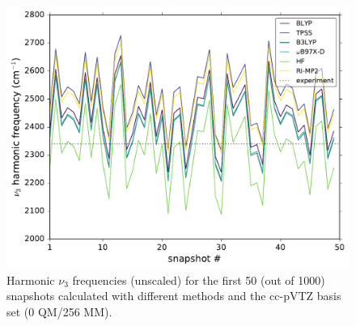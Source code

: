 \begin{figure}
  \centering
  \includegraphics[width=\textwidth]{./paper_02/trajectory_frequencies_cc-pvtz.pdf}
  \caption[Instantaneous method and basis set dependence of MD snapshots]{Harmonic \(\nu_{3}\) frequencies (unscaled) for the first \num{50} (out of \num{1000}) snapshots calculated with different methods and the cc-pVTZ basis set (0 QM/256 MM).}
  \label{paper_02:fig:S4}
\end{figure}

